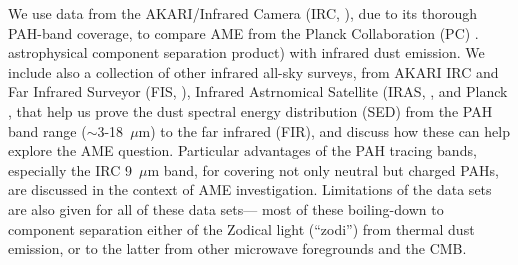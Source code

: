 \documentclass[12pt,a4paper]{article}
\begin{document}
 We use data from the AKARI/Infrared Camera (IRC, \cite{irc07,ishihara10}), due to its thorough PAH-band coverage, to compare AME from the Planck Collaboration (PC) \citep{planck15X}. astrophysical component separation product) with infrared dust emission. We include also a collection of other infrared all-sky surveys, from AKARI IRC and Far Infrared Surveyor (FIS, \cite{kawada07, doi15}), Infrared Astrnomical Satellite (IRAS, \cite{iras84},  and Planck \citep{hfi14viii}, that help us prove the dust spectral energy distribution (SED) from the PAH band range ($\sim$3-18~$\mu$m) to the far infrared (FIR), and discuss how these can help explore the AME question. Particular advantages of the PAH tracing bands, especially the IRC 9~$\mu$m band, for covering not only neutral but charged PAHs, are discussed in the context of AME investigation. Limitations of the data sets are also given for all of these data sets--- most of these boiling-down to component separation either of the Zodical light (``zodi'') from thermal dust emission, or to the latter from other microwave foregrounds and the CMB.
\end{document}
